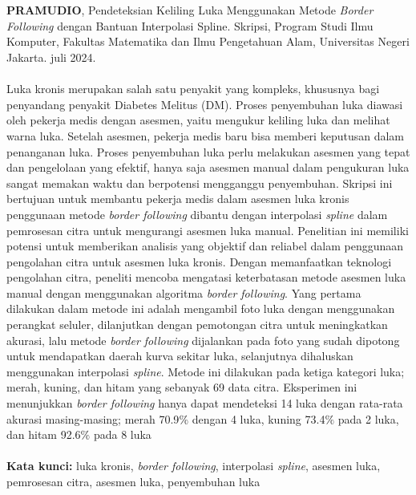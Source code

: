 \chapter*{}
\singlespacing{}

\textbf{PRAMUDIO}, Pendeteksian Keliling Luka Menggunakan Metode  
\textit{Border Following} dengan Bantuan Interpolasi Spline. Skripsi, Program Studi Ilmu Komputer, Fakultas Matematika dan Ilmu Pengetahuan Alam, Universitas Negeri Jakarta. juli 2024.
\\
\\
Luka kronis merupakan salah satu penyakit yang kompleks, khususnya bagi penyandang
penyakit Diabetes Melitus (DM). Proses penyembuhan luka diawasi oleh pekerja medis 
dengan asesmen, yaitu mengukur keliling luka dan melihat warna luka. Setelah asesmen, 
pekerja medis baru bisa memberi keputusan dalam penanganan luka. 
Proses penyembuhan luka perlu melakukan asesmen 
yang tepat dan pengelolaan yang efektif, hanya saja asesmen manual dalam pengukuran 
luka sangat memakan waktu dan berpotensi mengganggu penyembuhan. Skripsi ini 
bertujuan untuk membantu pekerja medis dalam asesmen luka kronis penggunaan 
metode \emph{border following} dibantu dengan interpolasi \textit{spline} 
dalam pemrosesan citra untuk mengurangi asesmen luka manual. 
Penelitian ini memiliki potensi untuk memberikan analisis yang 
objektif dan reliabel dalam penggunaan pengolahan citra untuk 
asesmen luka kronis. Dengan memanfaatkan teknologi pengolahan citra, 
peneliti mencoba mengatasi keterbatasan metode asesmen 
luka manual dengan menggunakan algoritma \emph{border following}. 
Yang pertama dilakukan dalam metode ini adalah mengambil foto luka dengan 
menggunakan perangkat seluler, dilanjutkan dengan pemotongan citra untuk 
meningkatkan akurasi, lalu metode \textit{border following} dijalankan pada 
foto yang sudah dipotong untuk mendapatkan daerah kurva sekitar luka, selanjutnya 
dihaluskan menggunakan interpolasi \textit{spline}. Metode ini dilakukan pada 
ketiga kategori luka; merah, kuning, dan hitam yang sebanyak 69 data citra. Eksperimen 
ini menunjukkan \textit{border following} hanya dapat mendeteksi 14 luka dengan 
rata-rata akurasi masing-masing; merah 70.9$\%$ dengan 4 luka, kuning 73.4$\%$ 
pada 2 luka, dan hitam 92.6$\%$ pada 8 luka
\\
\\
\textbf{Kata kunci:} luka kronis, \textit{border following}, 
interpolasi \textit{spline}, asesmen luka, pemrosesan citra, asesmen luka, penyembuhan luka
